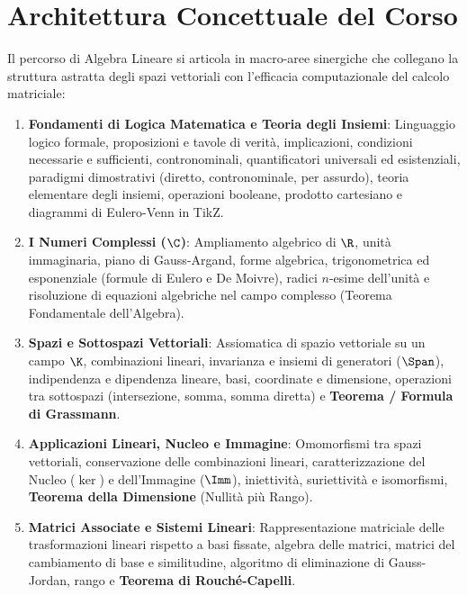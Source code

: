 \documentclass[11pt,a4paper,twoside,openright]{book}
\begin{document}
\cleardoublepage

\chapter*{Architettura Concettuale del Corso}

Il percorso di Algebra Lineare si articola in macro-aree sinergiche che collegano la struttura astratta degli spazi vettoriali con l'efficacia computazionale del calcolo matriciale:

\begin{enumerate}[start=0]
    \item \textbf{Fondamenti di Logica Matematica e Teoria degli Insiemi}:
    Linguaggio logico formale, proposizioni e tavole di verità, implicazioni, condizioni necessarie e sufficienti, contronominali, quantificatori universali ed esistenziali, paradigmi dimostrativi (diretto, contronominale, per assurdo), teoria elementare degli insiemi, operazioni booleane, prodotto cartesiano e diagrammi di Eulero-Venn in TikZ.

    \item \textbf{I Numeri Complessi ($\C$)}:
    Ampliamento algebrico di $\R$, unità immaginaria, piano di Gauss-Argand, forme algebrica, trigonometrica ed esponenziale (formule di Eulero e De Moivre), radici $n$-esime dell'unità e risoluzione di equazioni algebriche nel campo complesso (Teorema Fondamentale dell'Algebra).

    \item \textbf{Spazi e Sottospazi Vettoriali}:
    Assiomatica di spazio vettoriale su un campo $\K$, combinazioni lineari, invarianza e insiemi di generatori ($\Span$), indipendenza e dipendenza lineare, basi, coordinate e dimensione, operazioni tra sottospazi (intersezione, somma, somma diretta) e \textbf{Teorema / Formula di Grassmann}.

    \item \textbf{Applicazioni Lineari, Nucleo e Immagine}:
    Omomorfismi tra spazi vettoriali, conservazione delle combinazioni lineari, caratterizzazione del Nucleo ($\ker$) e dell'Immagine ($\Imm$), iniettività, suriettività e isomorfismi, \textbf{Teorema della Dimensione} (Nullità più Rango).

    \item \textbf{Matrici Associate e Sistemi Lineari}:
    Rappresentazione matriciale delle trasformazioni lineari rispetto a basi fissate, algebra delle matrici, matrici del cambiamento di base e similitudine, algoritmo di eliminazione di Gauss-Jordan, rango e \textbf{Teorema di Rouché-Capelli}.


\end{enumerate}
\end{document}
